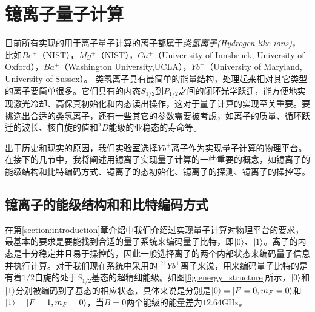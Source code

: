 
\chapter[镱离子量子计算]{镱离子量子计算\label{section:yb_computation}}

目前所有实现的用于离子量子计算的离子都属于\emph{类氢离子(Hydrogen-like ions)}， 比如$Be^+$（NIST\cite[]{Monroe_Meekhof_King_Itano_Wineland_2002,Lin_Gaebler_Reiter_Tan_Bowler_Wan_Keith_Knill_Glancy_Coakley_et_al_2016}），$Mg^+$（NIST\cite[]{Barrett_Schaetz_DeMarco_Britton_Chiaverini_Itano_Jelenkovic_Jost_Langer_Leibfried_et_al_2003, Wan_Kienzler_Erickson_Mayer_Tan_Wu_Vasconcelos_Glancy_Knill_Wineland_et_al_2019}），$Ca^+$（Univer-sity of Innsbruck\cite[]{Lanyon_Hempel_Nigg_Müller_Gerritsma_Zähringer_Schindler_Barreiro_Rambach_Kirchmair_et_al_2011,Monz_Nigg_Martinez_Brandl_Schindler_Rines_Wang_Chuang_Blatt_2016}, University of Oxford\cite[]{Ballance_Harty_Linke_Sepiol_Lucas_2016,Schäfer_Ballance_Thirumalai_Stephenson_Ballance_Steane_Lucas_2018}），$Ba^+$（Washington University\cite[]{Dietrich_2009,Dietrich_Kurz_Noel_Shu_Blinov_2010},UCLA\cite[]{Hucul_Christensen_Hudson_Campbell_2017}），$Yb^+$（University of Maryland\cite[]{Olmschenk_Younge_Moehring_Matsukevich_Maunz_Monroe_2007,Debnath_Linke_Figgatt_Landsman_Wright_Monroe_2016}, University of Sussex\cite[]{Weidt_Randall_Webster_Lake_Webb_Cohen_Navickas_Lekitsch_Retzker_Hensinger_2016}）。
类氢离子具有最简单的能量结构，处理起来相对其它类型的离子要简单很多。它们具有的内态$S_{1/2}$到$P_{1/2}$之间的闭环光学跃迁，能方便地实现激光冷却、高保真初始化和内态读出操作\cite[]{Harty_Allcock_Ballance_Guidoni_Janacek_Linke_Stacey_Lucas_2014}，这对于量子计算的实现至关重要。要挑选出合适的类氢离子，还有一些其它的参数需要被考虑，如离子的质量、循环跃迁的波长、核自旋的值和$^2D$能级的亚稳态的寿命等\cite[]{Bruzewicz_Chiaverini_McConnell_Sage_2019}。

出于历史和现实的原因，我们实验室选择$Yb^+$离子作为实现量子计算的物理平台。
在接下的几节中，我将阐述用镱离子实现量子计算的一些重要的概念，如镱离子的能级结构和比特编码方式、镱离子的态初始化、镱离子的探测、镱离子的操控等。

\section[镱离子的能级结构和和比特编码方式]{镱离子的能级结构和和比特编码方式}
在第\ref{section:introduction}章介绍中我们介绍过实现量子计算对物理平台的要求，最基本的要求是要能找到合适的量子系统来编码量子比特，即$\ket{0}$、$\ket{1}$。离子的内态是十分稳定并且易于操控的，因此一般选择离子的两个内部状态来编码量子信息并执行计算。对于我们现在系统中采用的$^{171}Yb^+$离子来说，用来编码量子比特的是有着$1/2$自旋的处于$S_{1/2}$基态的超精细能级\cite[]{Olmschenk_Younge_Moehring_Matsukevich_Maunz_Monroe_2007}。如图\ref{fig:energy_structure}所示，$\ket{0}$和$\ket{1}$分别被编码到了基态的相应状态，具体来说是分别是$\ket{0}=\ket{F=0,m_F=0}$和$\ket{1}=\ket{F=1,m_F=0}$，当$B=0$两个能级的能量差为$12.64$GHz。

